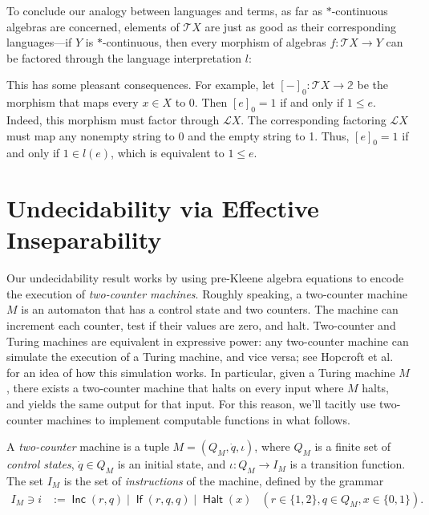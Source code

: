 \documentclass[a4paper,UKenglish,cleveref, autoref, thm-restate]{lipics-v2021}
\DeclareMathOperator{\Inc}{\mathsf{Inc}}
\DeclareMathOperator{\If}{\mathsf{If}}
\DeclareMathOperator{\Halt}{\mathsf{Halt}}
\begin{document}
To conclude our analogy between languages and terms, as far as $*$-continuous
algebras are concerned, elements of $\mathcal{T}X$ are just as good as their
%
corresponding languages---if $Y$ is $*$-continuous, then every morphism of
algebras $f : \mathcal{T}X  \to  Y$ can be factored through the language
interpretation $l$:
\begin{center}
\end{center}
This has some pleasant consequences.  For example, let
$[-]_0 : \mathcal{T}X  \to  \mathbb{2}$ be the morphism that maps every $x  \in  X$ to
0. Then $[e]_0 = 1$ if and only if $1  \leq  e$.  Indeed, this morphism must factor
through $\mathcal{L}X$.  The corresponding factoring $\mathcal{L}X$ must map any
nonempty string to 0 and the empty string to 1.  Thus, $[e]_0 = 1$ if and only
if $1  \in  l(e)$, which is equivalent to $1  \leq  e$.


\section{Undecidability via Effective Inseparability}
\label{sec:machines}

Our undecidability result works by using pre-Kleene algebra equations to encode
the execution of \emph{two-counter machines}.  Roughly speaking, a two-counter
machine $M$ is an automaton that has a control state and two counters.  The
machine can increment each counter, test if their values are zero, and halt.
%
Two-counter and Turing machines are equivalent in expressive power: any
two-counter machine can simulate the execution of a Turing machine, and vice
versa; see Hopcroft et al.~\cite[§8.5.3,§8.5.4]{Hopcroft2001} for an idea of how
this simulation works.  In particular, given a Turing machine $M$, there exists
a two-counter machine that halts on every input where $M$ halts, and yields the
same output for that input.  For this reason, we'll tacitly use two-counter
machines to implement computable functions in what follows.


\begin{definition}
  \label{def:two-counter-machine}
  A \emph{two-counter} machine is a tuple $M = (Q_M, \dot{q},  \iota )$, where $Q_M$
  is a finite set of \emph{control states}, $\dot{q}  \in  Q_M$ is an initial state,
  and $ \iota  : Q_M  \to  I_M$ is a transition function.  The set $I_M$ is the set of
  \emph{instructions} of the machine, defined by the grammar
  \begin{align*}
    I_M \ni i
    & := \Inc(r, q) \mid \If(r,q,q) \mid \Halt(x)
    & (r \in \{1,2\}, q \in Q_M, x \in \{0,1\}).
  \end{align*}
\end{definition}
\end{document}
